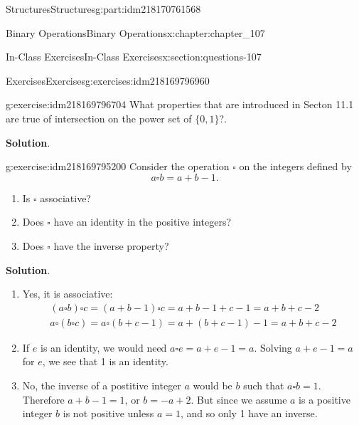 \documentclass[oneside,10pt,]{book}
\newcommand{\blocktitlefont}{\relax}
\numberwithin{equation}{section}
\begin{document}
\begin{partptx}{Structures}{}{Structures}{}{}{g:part:idm218170761568}
\begin{chapterptx}{Binary Operations}{}{Binary Operations}{}{}{x:chapter:chapter_107}
\typeout{************************************************}
%
\begin{sectionptx}{In-Class Exercises}{}{In-Class Exercises}{}{}{x:section:questions-107}
%
%
%
\typeout{************************************************}
\typeout{************************************************}
%
\begin{exercises-subsection-numberless}{Exercises}{}{Exercises}{}{}{g:exercises:idm218169796960}
\par\medskip\noindent%
%
\begin{exercisegroup}
\begin{divisionexerciseeg}{1}{}{}{g:exercise:idm218169796704}%
What properties that are introduced in Secton 11.1 are true of intersection on the power set of \(\{0,1\}\)?.%
\par\smallskip%
\noindent\textbf{\blocktitlefont Solution}.\hypertarget{g:solution:idm218169795456}{}\quad{}%
\end{divisionexerciseeg}%
\begin{divisionexerciseeg}{2}{}{}{g:exercise:idm218169795200}%
Consider the  operation \(\square\) on the  integers defined by%
\begin{equation*}
a \square b  = a+b-1.
\end{equation*}
%
\begin{enumerate}[label=(\alph*)]
\item{}Is \(\square\) associative?%
\item{}Does  \(\square\) have an identity in the positive integers?%
\item{}Does  \(\square\) have the inverse property?%
\end{enumerate}
%
\par\smallskip%
\noindent\textbf{\blocktitlefont Solution}.\hypertarget{g:solution:idm218169790656}{}\quad{}%
\begin{enumerate}[label=(\alph*)]
\item{}Yes, it is associative:%
\begin{gather*}
(a \square b)\square c= (a+b-1)\square c = a+b-1+c-1 = a+b+c-2\\
a \square(b \square c)= a \square(b+c-1) = a+(b+c-1)-1 = a+b+c-2
\end{gather*}
%
\item{}If \(e\) is an identity,  we would need \(a \square e=a+e-1 = a.\)  Solving \(a+e-1 = a\) for \(e\), we see that 1 is an identity.%
\item{}No, the inverse of a postitive integer \(a\)  would be \(b\)   such that \(a \square b=1\).   Therefore \(a+b-1=1\), or \(b=-a+2\).  But since we assume \(a\) is a positive integer \(b\) is not positive unless \(a = 1\),  and so only 1 have an inverse.%

\end{enumerate}
\end{divisionexerciseeg}
\end{exercisegroup}
\end{exercises-subsection-numberless}
\end{sectionptx}
\end{chapterptx}
\end{partptx}
\end{document}
